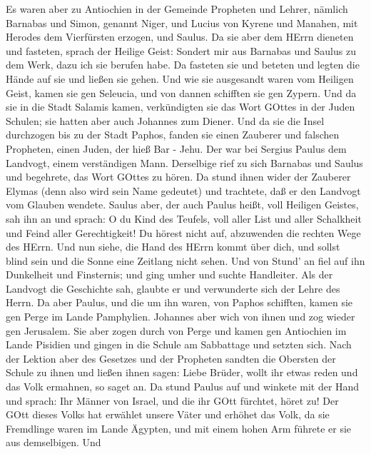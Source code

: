  Es waren aber zu Antiochien in der Gemeinde Propheten und
Lehrer, nämlich Barnabas und Simon, genannt Niger, und Lucius von Kyrene
und Manahen, mit Herodes dem Vierfürsten erzogen, und Saulus.
 Da sie aber dem HErrn dieneten und fasteten, sprach der
Heilige Geist: Sondert mir aus Barnabas und Saulus zu dem Werk, dazu ich
sie berufen habe.  Da fasteten sie und beteten und legten
die Hände auf sie und ließen sie gehen.  Und wie sie
ausgesandt waren vom Heiligen Geist, kamen sie gen Seleucia, und von
dannen schifften sie gen Zypern.  Und da sie in die Stadt
Salamis kamen, verkündigten sie das Wort GOttes in der Juden Schulen;
sie hatten aber auch Johannes zum Diener.  Und da sie die
Insel durchzogen bis zu der Stadt Paphos, fanden sie einen Zauberer und
falschen Propheten, einen Juden, der hieß Bar - Jehu.  Der
war bei Sergius Paulus dem Landvogt, einem verständigen Mann. Derselbige
rief zu sich Barnabas und Saulus und begehrete, das Wort GOttes zu
hören.  Da stund ihnen wider der Zauberer Elymas (denn also
wird sein Name gedeutet) und trachtete, daß er den Landvogt vom Glauben
wendete.  Saulus aber, der auch Paulus heißt, voll Heiligen
Geistes, sah ihn an  und sprach: O du Kind des Teufels,
voll aller List und aller Schalkheit und Feind aller Gerechtigkeit! Du
hörest nicht auf, abzuwenden die rechten Wege des HErrn. 
Und nun siehe, die Hand des HErrn kommt über dich, und sollst blind sein
und die Sonne eine Zeitlang nicht sehen. Und von Stund' an fiel auf ihn
Dunkelheit und Finsternis; und ging umher und suchte Handleiter.
 Als der Landvogt die Geschichte sah, glaubte er und
verwunderte sich der Lehre des Herrn.  Da aber Paulus, und
die um ihn waren, von Paphos schifften, kamen sie gen Perge im Lande
Pamphylien. Johannes aber wich von ihnen und zog wieder gen Jerusalem.
 Sie aber zogen durch von Perge und kamen gen Antiochien im
Lande Pisidien und gingen in die Schule am Sabbattage und setzten sich.
 Nach der Lektion aber des Gesetzes und der Propheten
sandten die Obersten der Schule zu ihnen und ließen ihnen sagen: Liebe
Brüder, wollt ihr etwas reden und das Volk ermahnen, so saget an.
 Da stund Paulus auf und winkete mit der Hand und sprach:
Ihr Männer von Israel, und die ihr GOtt fürchtet, höret zu!
 Der GOtt dieses Volks hat erwählet unsere Väter und
erhöhet das Volk, da sie Fremdlinge waren im Lande Ägypten, und mit
einem hohen Arm führete er sie aus demselbigen.  Und
